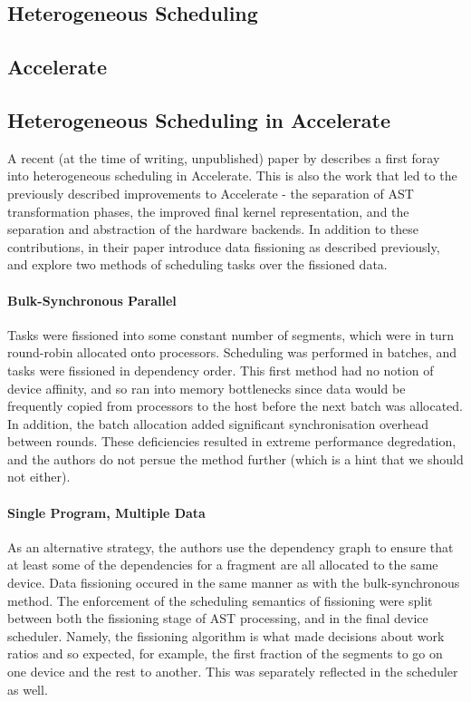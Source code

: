 \documentclass[a4paper,12pt]{article}
\begin{document}
\subsection{Heterogeneous Scheduling}


\subsection{Accelerate}

\subsection{Heterogeneous Scheduling in Accelerate}
A recent (at the time of writing, unpublished) paper by \citet*{newton_converting_2014} describes a first foray into heterogeneous scheduling in Accelerate.
This is also the work that led to the previously described improvements to Accelerate - the separation of AST transformation phases, the improved final kernel representation, and the separation and abstraction of the hardware backends. 
In addition to these contributions, in their paper  \citeauthor{newton_converting_2014} introduce data fissioning as described previously, and explore two methods of scheduling tasks over the fissioned data.

\paragraph*{Bulk-Synchronous Parallel} 
Tasks were fissioned into some constant number of segments, which were in turn round-robin allocated onto processors.
Scheduling was performed in batches, and tasks were fissioned in dependency order.
This first method had no notion of device affinity, and so ran into memory bottlenecks since data would be frequently copied from processors to the host before the next batch was allocated.
In addition, the batch allocation added significant synchronisation overhead between rounds.
These deficiencies resulted in extreme performance degredation, and the authors do not persue the method further (which is a hint that we should not either).

\paragraph*{Single Program, Multiple Data}
As an alternative strategy, the authors use the dependency graph to ensure that at least some of the dependencies for a fragment are all allocated to the same device.
Data fissioning occured in the same manner as with the bulk-synchronous method.
The enforcement of the scheduling semantics of fissioning were split between both the fissioning stage of AST processing, and in the final device scheduler.
Namely, the fissioning algorithm is what made decisions about work ratios and so expected, for example, the first fraction of the segments to go on one device and the rest to another.
This was separately reflected in the scheduler as well.
\end{document}
